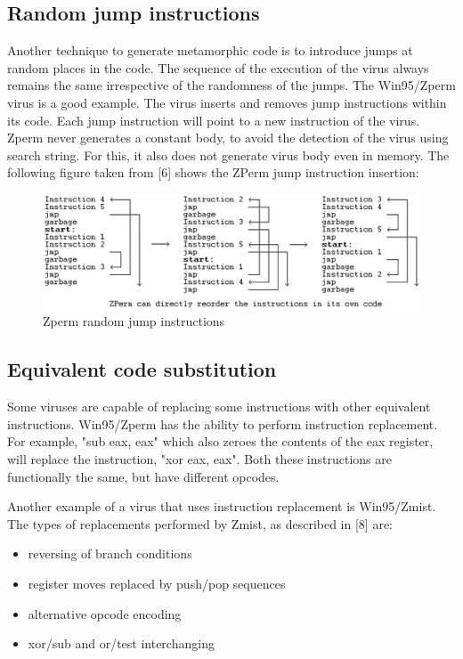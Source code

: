 \subsection{Random jump instructions}
Another technique to generate metamorphic code is to introduce jumps at random places in the code. The sequence of the execution of the virus always remains the same irrespective of the randomness of the jumps. The Win95/Zperm virus is a good example. The virus inserts and removes jump instructions within its code. Each jump instruction will point to a new instruction of the virus. Zperm never generates a constant body, to avoid the detection of the virus using search string. For this, it also does not generate virus body even in memory. The following figure taken from [6] shows the ZPerm jump instruction insertion:  

\begin{figure}[htb]
\centering
\includegraphics[width=1.0\textwidth]{images/zperm.jpg}
\caption{Zperm random jump instructions} 
\label{fig:Zperm random jump instructions}
\end{figure}

\subsection{Equivalent code substitution}
Some viruses are capable of replacing some instructions with other equivalent instructions. Win95/Zperm has the ability to perform instruction replacement. For example, "sub eax, eax" which also zeroes the contents of the eax register, will replace the instruction, "xor eax, eax". Both these instructions are functionally the same, but have different opcodes. 

Another example of a virus that uses instruction replacement is Win95/Zmist. The types of replacements performed by Zmist, as described in [8] are:
\begin{itemize}
\item reversing of branch conditions
\item register moves replaced by push/pop sequences 
\item alternative opcode encoding 
\item xor/sub and or/test interchanging
\end{itemize}

